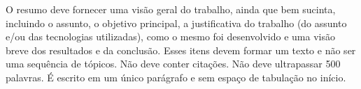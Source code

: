 
\begin{resumoutfpr}%
O resumo deve fornecer uma visão geral do trabalho, ainda que bem sucinta, incluindo o assunto, o objetivo principal, a justificativa do trabalho (do assunto e/ou das tecnologias utilizadas), como o mesmo foi desenvolvido e uma visão breve dos resultados e da conclusão. Esses itens devem formar um texto e não ser uma sequência de tópicos. Não deve conter citações. Não deve ultrapassar 500 palavras. É escrito em um único parágrafo e sem espaço de tabulação no início.
\end{resumoutfpr}
